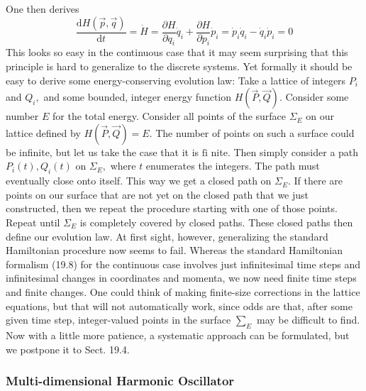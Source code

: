 \documentclass[main.tex]{subfiles}
\begin{document}
One then derives
$$
\frac{\mathrm{d} H(\vec{p}, \vec{q})}{\mathrm{d} t}=\dot{H}=\frac{\partial H}{\partial q_{i}} \dot{q}_{i}+\frac{\partial H}{\partial p_{i}} \dot{p}_{i}=\dot{p}_{i} \dot{q}_{i}-\dot{q}_{i} \dot{p}_{i}=0
$$
This looks so easy in the continuous case that it may seem surprising that this principle is hard to generalize to the discrete systems. Yet formally it should be easy to derive some energy-conserving evolution law:
Take a lattice of integers $P_{i}$ and $Q_{i},$ and some bounded, integer energy function $H(\vec{P}, \vec{Q}) .$ Consider some number $E$ for the total energy. Consider all points of the surface $\Sigma_{E}$ on our lattice defined by $H(\vec{P}, \vec{Q})=E .$ The number of points on such a surface could be infinite, but let us take the case that it is $\mathrm{fi}$ nite. Then simply consider a path $P_{i}(t), Q_{i}(t)$ on $\Sigma_{E},$ where $t$ enumerates the integers. The path must eventually close onto itself. This way we get a closed path on $\Sigma_{E} .$ If there are points on our surface that are not yet on the closed path that we just constructed, then we repeat the procedure starting with one of those points. Repeat until $\Sigma_{E}$ is completely covered by closed paths. These closed paths then define our evolution law.
At first sight, however, generalizing the standard Hamiltonian procedure now seems to fail. Whereas the standard Hamiltonian formalism (19.8) for the continuous case involves just infinitesimal time steps and infinitesimal changes in coordinates and momenta, we now need finite time steps and finite changes. One could think of making finite-size corrections in the lattice equations, but that will not automatically work, since odds are that, after some given time step, integer-valued points in the
surface $\sum_E$ may be difficult to find. Now with a little more patience, a systematic
approach can be formulated, but we postpone it to Sect. 19.4.


\subsubsection{Multi-dimensional Harmonic Oscillator}\label{ch19.3.1}
\end{document}
